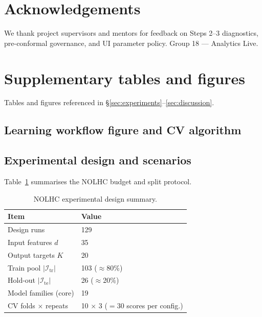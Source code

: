 \documentclass[10pt,twocolumn]{article}
\newcommand{\train}{\mathcal{I}_{\mathrm{tr}}}
\newcommand{\test}{\mathcal{I}_{\mathrm{te}}}
\begin{document}
\section*{Acknowledgements}
We thank project supervisors and mentors for feedback on Steps 2--3 diagnostics, pre-conformal governance, and UI parameter policy.
Group 18 --- Analytics Live.



\appendix

\section{Supplementary tables and figures}
\label{app:supp}

Tables and figures referenced in \S\ref{sec:experiments}--\ref{sec:discussion}.

\subsection{Learning workflow figure and CV algorithm}
\label{app:workflow}



\subsection{Experimental design and scenarios}

Table~\ref{tab:data} summarises the NOLHC budget and split protocol.

\begin{table}[h]
  \centering
  \caption{NOLHC experimental design summary.}
  \label{tab:data}
  \small
  \begin{tabular}{@{}ll@{}}
    \toprule
    Item & Value \\
    \midrule
    Design runs & 129 \\
    Input features $d$ & 35 \\
    Output targets $K$ & 20 \\
    Train pool $|\train|$ & 103 ($\approx$80\%) \\
    Hold-out $|\test|$ & 26 ($\approx$20\%) \\
    Model families (core) & 19 \\
    CV folds $\times$ repeats & 10 $\times$ 3 ($=30$ scores per config.) \\
    \bottomrule
  \end{tabular}
\end{table}
\end{document}
